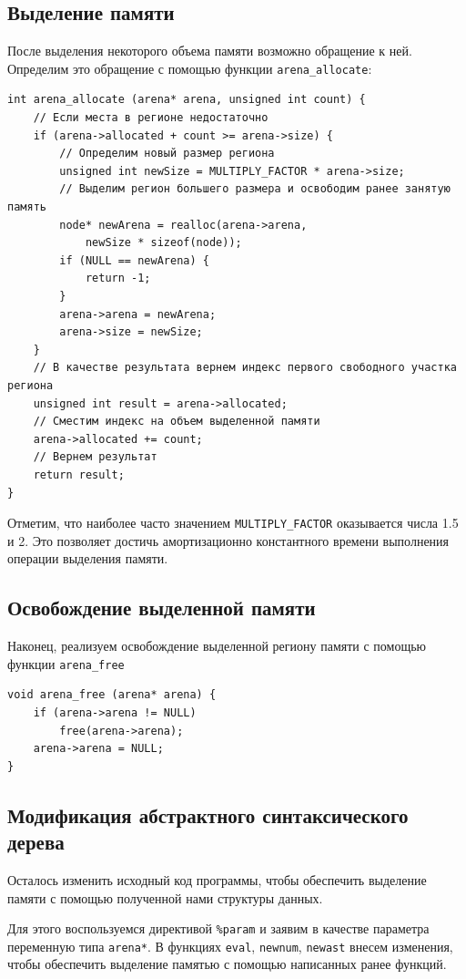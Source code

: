 \documentclass[coursework]{SCWorks}
\begin{document}
\subsection{Выделение памяти}
    После выделения некоторого объема памяти возможно обращение к ней. Определим это обращение с помощью функции \texttt{arena\_allocate}:
\begin{verbatim} 
int arena_allocate (arena* arena, unsigned int count) {
    // Если места в регионе недостаточно
    if (arena->allocated + count >= arena->size) {
        // Определим новый размер региона
        unsigned int newSize = MULTIPLY_FACTOR * arena->size;
        // Выделим регион большего размера и освободим ранее занятую память
        node* newArena = realloc(arena->arena, 
            newSize * sizeof(node));
        if (NULL == newArena) {
            return -1;
        }
        arena->arena = newArena;
        arena->size = newSize;
    }
    // В качестве результата вернем индекс первого свободного участка региона
    unsigned int result = arena->allocated;
    // Сместим индекс на объем выделенной памяти
    arena->allocated += count;
    // Вернем результат
    return result;
}
\end{verbatim}
Отметим, что наиболее часто значением \texttt{MULTIPLY\_FACTOR} оказывается числа
1.5 и 2. Это позволяет достичь амортизационно константного времени выполнения операции выделения памяти\cite{12}.
\subsection{Освобождение выделенной памяти}
Наконец, реализуем освобождение выделенной региону памяти с помощью функции \texttt{arena\_free}
\begin{verbatim} 
void arena_free (arena* arena) {
    if (arena->arena != NULL)
        free(arena->arena);
    arena->arena = NULL;
}
\end{verbatim}
\subsection{Модификация абстрактного синтаксического дерева}
Осталось изменить исходный код программы, чтобы обеспечить выделение памяти с помощью полученной нами структуры данных.

Для этого воспользуемся директивой \texttt{\%param} и заявим в качестве параметра переменную типа \texttt{arena*}. В функциях \texttt{eval}, \texttt{newnum}, \texttt{newast} внесем изменения, чтобы обеспечить выделение памятью с помощью написанных ранее функций.
\end{document}
